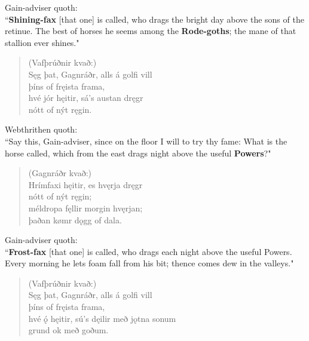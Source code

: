 \bvb Gain-adviser quoth: \\ “\textbf{Shining-fax} [that one] is called, who drags the bright day above the sons of the retinue. The best of horses he seems among the \textbf{Rode-goths}; the mane of that stallion ever shines." \\

\begin{verse}
(Vafþrúðnir kvað:) \\%
\bva Sęg þat, Gagnráðr, \hld alls á golfi vill \\%
\ind þíns of fręista frama, \\%
hvé jór hęitir, \hld sá's austan dręgr \\%
\ind nótt of nýt ręgin.\\%
\end{verse}

\bvb Webthrithen quoth: \\ “Say this, Gain-adviser, since on the floor I will to try thy fame: What is the horse called, which from the east drags night above the useful \textbf{Powers}?" \\

\begin{verse}
(Gagnráðr kvað:) \\%
\bva Hrímfaxi hęitir, \hld es hvęrja dręgr \\%
\ind nótt of nýt ręgin; \\%
méldropa fęllir \hld morgin hvęrjan; \\%
\ind þaðan kømr dǫgg of dala.\\%
\end{verse}

\bvb Gain-adviser quoth: \\ “\textbf{Frost-fax} [that one] is called, who drags each night above the useful Powers. Every morning he lets foam fall from his bit\footnotemark[26]; thence comes dew in the valleys." \\

\begin{verse}
(Vafþrúðnir kvað:) \\%
\bva Sęg þat, Gagnráðr, \hld alls á golfi vill \\%
\ind þíns of fręista frama, \\%
hvé ǫ́ hęitir, \hld sú's dęilir með jǫtna sonum \\%
\ind grund ok með goðum.\\%
\end{verse}

